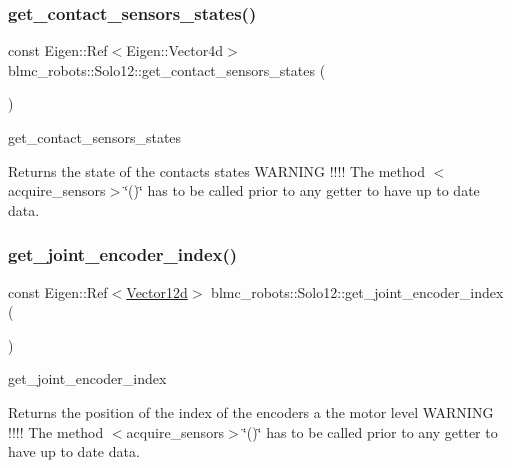\subsubsection{\texorpdfstring{get\+\_\+contact\+\_\+sensors\+\_\+states()}{get\_contact\_sensors\_states()}}
{\footnotesize\ttfamily const Eigen\+::\+Ref$<$Eigen\+::\+Vector4d$>$ blmc\+\_\+robots\+::\+Solo12\+::get\+\_\+contact\+\_\+sensors\+\_\+states (\begin{DoxyParamCaption}{ }\end{DoxyParamCaption})\hspace{0.3cm}{\ttfamily [inline]}}



get\+\_\+contact\+\_\+sensors\+\_\+states 

\begin{DoxyReturn}{Returns}
the state of the contacts states W\+A\+R\+N\+I\+NG !!!! The method $<$acquire\+\_\+sensors$>$\char`\"{}()\char`\"{} has to be called prior to any getter to have up to date data. 
\end{DoxyReturn}
\mbox{\label{classblmc__robots_1_1Solo12_a7569444864f60d87ba9d9d0b5cc01afe}} 
\subsubsection{\texorpdfstring{get\+\_\+joint\+\_\+encoder\+\_\+index()}{get\_joint\_encoder\_index()}}
{\footnotesize\ttfamily const Eigen\+::\+Ref$<$\hyperlink{common__header_8hpp_a80313eb420184518596e745eecf4b494}{Vector12d}$>$ blmc\+\_\+robots\+::\+Solo12\+::get\+\_\+joint\+\_\+encoder\+\_\+index (\begin{DoxyParamCaption}{ }\end{DoxyParamCaption})\hspace{0.3cm}{\ttfamily [inline]}}



get\+\_\+joint\+\_\+encoder\+\_\+index 

\begin{DoxyReturn}{Returns}
the position of the index of the encoders a the motor level W\+A\+R\+N\+I\+NG !!!! The method $<$acquire\+\_\+sensors$>$\char`\"{}()\char`\"{} has to be called prior to any getter to have up to date data. 
\end{DoxyReturn}
\mbox{\label{classblmc__robots_1_1Solo12_ab24a09564c336625a945523a74f91112}} 
